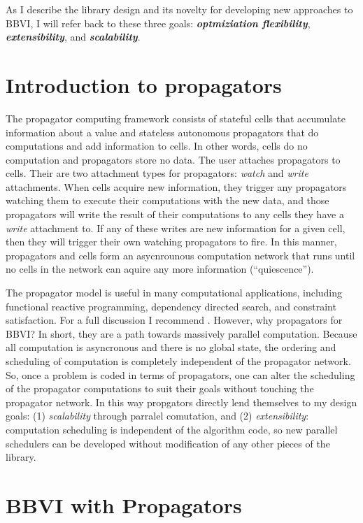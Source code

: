 \documentclass[12pt]{article}
\begin{document}
As I describe the library design and its novelty for developing new
approaches to BBVI, I will refer back to these three goals:
\textbf{\emph{optmiziation flexibility}}, \textbf{\emph{extensibility}}, and \textbf{\emph{scalability}}.

\section{Introduction to propagators}

The propagator computing framework \citep{radul-2009} consists of
stateful cells that accumulate information about a value and stateless
autonomous propagators that do computations and add information to
cells. In other words, cells do no computation and propagators store
no data. The user attaches propagators to cells. Their are two
attachment types for propagators: \textit{watch} and \textit{write}
attachments. When cells acquire new information, they trigger any
propagators watching them to execute their computations with the new
data, and those propagators will write the result of their
computations to any cells they have a \textit{write} attachment to. If any
of these writes are new information for a given cell, then they will
trigger their own watching propagators to fire. In this manner,
propagators and cells form an asycnrounous computation network that
runs until no cells in the network can aquire any more information
(``quiescence'').

The propagator model is useful in many computational applications,
including functional reactive programming, dependency directed search,
and constraint satisfaction. For a full discussion I recommend
\citet{radul-2009}. However, why propagators for BBVI? In short, they
are a path towards massively parallel computation. Because all
computation is asyncronous and there is no global state, the ordering
and scheduling of computation is completely independent of the
propagator network. So, once a problem is coded in terms of
propagators, one can alter the scheduling of the propagator
computations to suit their goals without touching the propagator
network. In this way propgators directly lend themselves to my design
goals: (1) \textit{scalability} through  parralel comutation,
and (2) \textit{extensibility}: computation scheduling is independent
of the algorithm code, so new parallel schedulers can be developed
without modification of any other pieces of the library.

\section{BBVI with Propagators}
\end{document}
